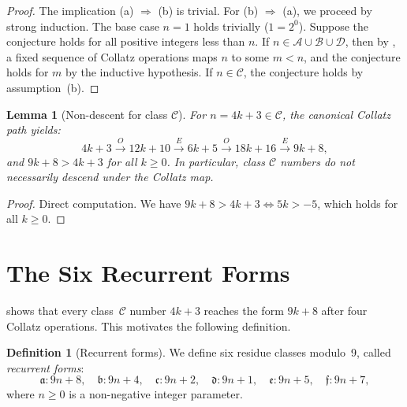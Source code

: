 \documentclass[11pt,a4paper]{article}
\theoremstyle{plain}
\newtheorem{lemma}[theorem]{Lemma}
\theoremstyle{definition}
\newtheorem{definition}[theorem]{Definition}
\begin{document}
\begin{proof}
  The implication (a) $\Rightarrow$ (b) is trivial. For (b) $\Rightarrow$ (a), we proceed by strong induction. The base case $n=1$ holds trivially ($1 = 2^0$). Suppose the conjecture holds for all positive integers less than $n$. If $n \in \mathcal{A} \cup \mathcal{B} \cup \mathcal{D}$, then by , a fixed sequence of Collatz operations maps $n$ to some $m < n$, and the conjecture holds for $m$ by the inductive hypothesis. If $n \in \mathcal{C}$, the conjecture holds by assumption~(b).
\end{proof}

\begin{lemma}[Non-descent for class $\mathcal{C}$]\label{lem:non_descent}
  For $n = 4k+3 \in \mathcal{C}$, the canonical Collatz path yields:
  \begin{equation}\label{eq:classC_path}
    4k+3 \xrightarrow{O} 12k+10 \xrightarrow{E} 6k+5 \xrightarrow{O} 18k+16 \xrightarrow{E} 9k+8,
  \end{equation}
  and $9k+8 > 4k+3$ for all $k \geq 0$. In particular, class $\mathcal{C}$ numbers do not necessarily descend under the Collatz map.
\end{lemma}

\begin{proof}
  Direct computation. We have $9k+8 > 4k+3 \iff 5k > -5$, which holds for all $k \geq 0$.
\end{proof}

\section{The Six Recurrent Forms}
\label{sec:recurrent}

 shows that every class~$\mathcal{C}$ number $4k+3$ reaches the form $9k+8$ after four Collatz operations. This motivates the following definition.

\begin{definition}[Recurrent forms]\label{def:recurrent_forms}
  We define six residue classes modulo~9, called \emph{recurrent forms}:
  \[
    \mathfrak{a}: 9n+8, \quad \mathfrak{b}: 9n+4, \quad \mathfrak{c}: 9n+2, \quad \mathfrak{d}: 9n+1, \quad \mathfrak{e}: 9n+5, \quad \mathfrak{f}: 9n+7,
  \]
  where $n \geq 0$ is a non-negative integer parameter.
\end{definition}
\end{document}
